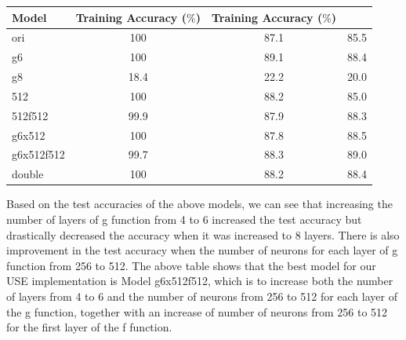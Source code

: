 \documentclass{article}
\begin{document}
 

\begin{center}

\begin{tabular}{|l|c|c|c|}

 

\hline

\textbf{Model}&\textbf{Training Accuracy ($\%$)}&\textbf{Training Accuracy ($\%$)}\\

\hline

ori&100&87.1&85.5\\

\hline

g6&100&89.1&88.4\\

\hline

g8&18.4&22.2&20.0\\

\hline

512&100&88.2&85.0\\

\hline

512f512&99.9&87.9&88.3\\

\hline

g6x512&100&87.8&88.5\\

\hline

g6x512f512&99.7&88.3&89.0\\

\hline

double&100&88.2&88.4\\

\hline

 

\end{tabular}

\end{center}

 

Based on the test accuracies of the above models, we can see that increasing the number of layers of g function from 4 to 6 increased the test accuracy but drastically decreased the accuracy when it was increased to 8 layers. There is also improvement in the test accuracy when the number of neurons for each layer of g function from 256 to 512. The above table shows that the best model for our USE implementation is Model g6x512f512, which is to increase both the number of layers from 4 to 6 and the number of neurons from 256 to 512 for each layer of the g function, together with an increase of number of neurons from 256 to 512 for the first layer of the f function.
\end{document}
